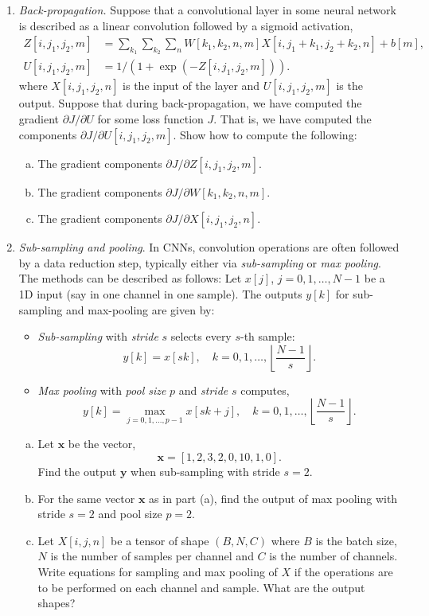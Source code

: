 \documentclass[11pt]{article}
\newcommand{\xbf}{\mathbf{x}}
\newcommand{\ybf}{\mathbf{y}}
\begin{document}
\begin{enumerate}
\item \emph{Back-propagation.}
Suppose that a convolutional layer in some neural network
is described as a linear convolution followed by a sigmoid activation,
\begin{align*}
    Z[i,j_1,j_2,m] &= \sum_{k_1} \sum_{k_2} \sum_n W[k_1,k_2,n,m]X[i,j_1+k_1,j_2+k_2,n] + b[m], \\
    U[i,j_1,j_2,m] &= 1/(1+\exp(-Z[i,j_1,j_2,m])).
\end{align*}
where $X[i,j_1,j_2,n]$ is the input of the layer and $U[i,j_1,j_2,m]$ is the output.
Suppose that during back-propagation, we have computed the gradient $\partial J/\partial U$ for some loss function $J$.
That is, we have computed  the components $\partial J/\partial U[i,j_1,j_2,m]$.
Show how to compute the following:
\begin{enumerate}[(a)]
\item The gradient components $\partial J/\partial Z[i,j_1,j_2,m]$.
\item The gradient components $\partial J/\partial W[k_1,k_2,n,m]$.
\item The gradient components $\partial J/\partial X[i,j_1,j_2,n]$.
\end{enumerate}

\item \emph{Sub-sampling and pooling}.
In CNNs, convolution operations are often followed
by a data reduction step, typically either via \emph{sub-sampling} or \emph{max pooling}.
The methods can be described as follows:
Let $x[j]$, $j=0,1,\ldots,N-1$ be a 1D input (say in one channel in one sample).
The outputs $y[k]$ for sub-sampling and max-pooling are given by:
\begin{itemize}
\item \emph{Sub-sampling} with \emph{stride} $s$ selects every $s$-th sample:
\[
    y[k] = x[sk], \quad k=0,1,\ldots, \left\lfloor \frac{N-1}{s} \right\rfloor.
\]
\item \emph{Max pooling} with \emph{pool size} $p$ and \emph{stride} $s$ computes,
\[
    y[k] = \max_{j=0,1,\ldots,p-1} x[sk+j], \quad  k=0,1,\ldots, \left\lfloor \frac{N-1}{s} \right\rfloor.
\]
\end{itemize}
\begin{enumerate}[(a)]
\item Let $\xbf$ be the vector,
\[
    \xbf = [1,2,3,2,0,10,1,0].
\]
Find the output $\ybf$ when sub-sampling with stride $s=2$.

\item For the same vector $\xbf$ as in part (a), find the output of max pooling with
stride $s=2$ and pool size $p=2$.

\item Let $X[i,j,n]$ be a tensor of shape $(B,N,C)$ where $B$ is the batch size,
$N$ is the number of samples per channel and $C$ is the number of channels.
Write equations for sampling and max pooling of $X$ if the operations are to be
performed on each channel and sample.  What are the output shapes?

\end{enumerate}

\end{enumerate}
\end{document}

